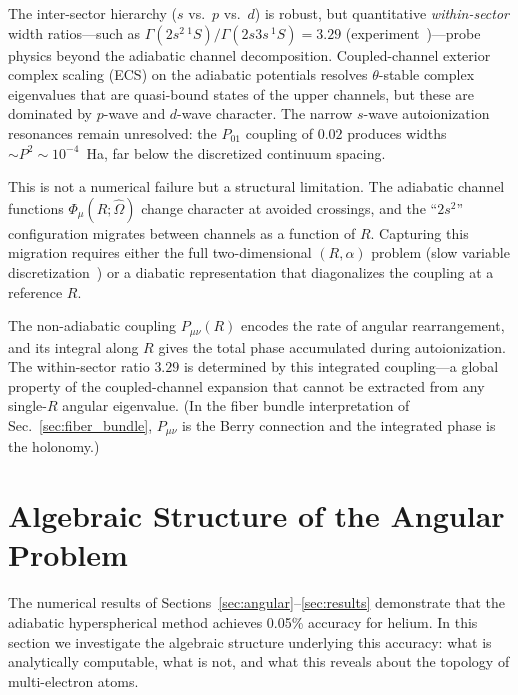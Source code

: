 \documentclass[aps,pra,twocolumn,superscriptaddress,longbibliography]{revtex4-2}
\begin{document}
The inter-sector hierarchy ($s$ vs.\ $p$ vs.\ $d$) is robust, but
quantitative \emph{within-sector} width ratios---such as
$\Gamma(2s^2\,{}^1\!S)/\Gamma(2s3s\,{}^1\!S) = 3.29$
(experiment~\cite{Madden1963})---probe physics beyond the adiabatic
channel decomposition.  Coupled-channel exterior complex scaling (ECS)
on the adiabatic potentials resolves $\theta$-stable complex
eigenvalues that are quasi-bound states of the upper channels, but
these are dominated by $p$-wave and $d$-wave character.  The narrow
$s$-wave autoionization resonances remain unresolved: the $P_{01}$
coupling of $0.02$ produces widths $\sim P^2 \sim 10^{-4}$~Ha,
far below the discretized continuum spacing.

This is not a numerical failure but a structural limitation.  The
adiabatic channel functions $\Phi_\mu(R; \hat\Omega)$ change
character at avoided crossings, and the ``$2s^2$'' configuration
migrates between channels as a function of $R$.  Capturing this
migration requires either the full two-dimensional $(R, \alpha)$
problem (slow variable discretization~\cite{Tolstikhin1996}) or a
diabatic representation that diagonalizes the coupling at a
reference $R$.

The non-adiabatic coupling $P_{\mu\nu}(R)$ encodes the rate of
angular rearrangement, and its integral along $R$ gives the total
phase accumulated during autoionization.  The within-sector ratio
$3.29$ is determined by this integrated coupling---a global property
of the coupled-channel expansion that cannot be extracted from any
single-$R$ angular eigenvalue.  (In the fiber bundle interpretation
of Sec.~\ref{sec:fiber_bundle}, $P_{\mu\nu}$ is the Berry connection
and the integrated phase is the holonomy.)


\section{Algebraic Structure of the Angular Problem}
\label{sec:algebraic}

The numerical results of Sections~\ref{sec:angular}--\ref{sec:results}
demonstrate that the adiabatic hyperspherical method achieves 0.05\%
accuracy for helium.  In this section we investigate the algebraic
structure underlying this accuracy: what is analytically computable,
what is not, and what this reveals about the topology of multi-electron
atoms.
\end{document}
